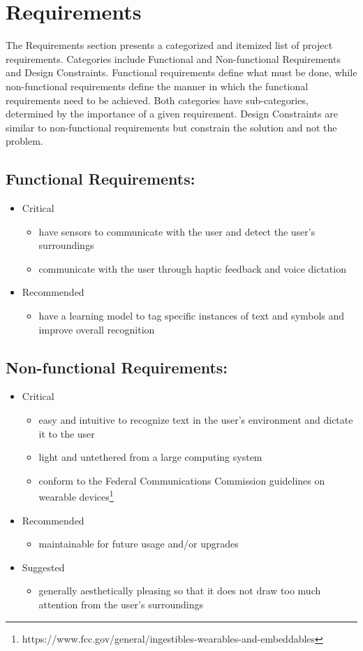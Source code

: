 \chapter{Requirements}
The Requirements section presents a categorized and itemized list of project requirements. Categories include Functional and Non-functional Requirements and Design Constraints. Functional requirements define what must be done, while non-functional requirements define the manner in which the functional requirements need to be achieved. Both categories have sub-categories, determined by the importance of a given requirement. Design Constraints are similar to non-functional requirements but constrain the solution and not the problem.
\section{Functional Requirements:}
\begin{itemize}
\item Critical
	\begin{itemize}
	\item have sensors to communicate with the user and detect the user's surroundings
	\item communicate with the user through haptic feedback and voice dictation
    \end{itemize}
\item Recommended
	\begin{itemize}
	\item have a learning model to tag specific instances of text and symbols and improve overall recognition
	\end{itemize}
\end{itemize}

\pagebreak

\section{Non-functional Requirements:}
\begin{itemize}
\item Critical
	\begin{itemize}
	\item easy and intuitive to recognize text in the user's environment and dictate it to the user
	\item light and untethered from a large computing system
	\item conform to the Federal Communications Commission guidelines on wearable devices\footnote{https://www.fcc.gov/general/ingestibles-wearables-and-embeddables}
    \end{itemize}
\item Recommended
	\begin{itemize}
	\item maintainable for future usage and/or upgrades
	\end{itemize}
\item Suggested
    \begin{itemize}
	\item generally aesthetically pleasing so that it does not draw too much attention from the user's surroundings
	\end{itemize}
\end{itemize}

